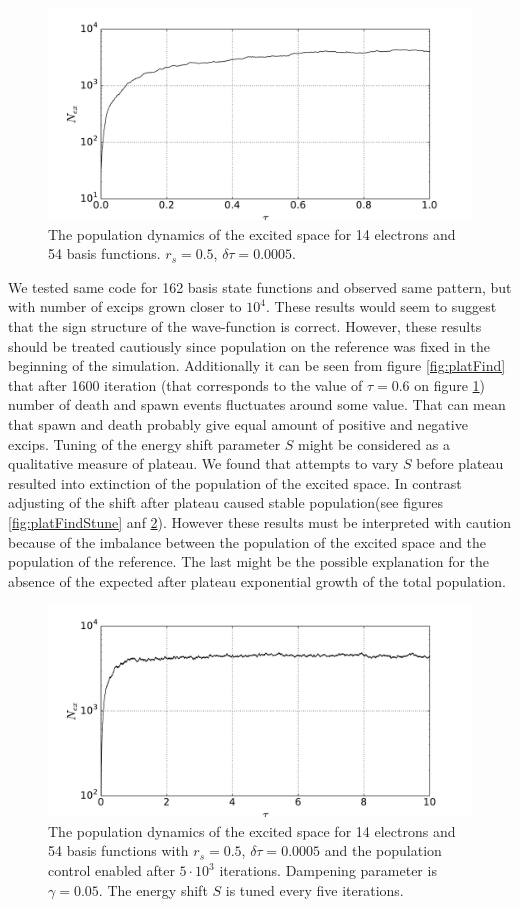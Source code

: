 \documentclass[twoside,english]{uiofysmaster}
\begin{document}
\begin{figure}[ht!]
	\centering
	\includegraphics[width=0.8\linewidth]{Nex2000new}
	\caption{The population dynamics of the excited space for 14 electrons and 54 basis functions. $r_s=0.5$, $\delta \tau=0.0005$.}
	\label{fig:nx2k}
\end{figure}

We tested same code for 162 basis state functions and observed same pattern, but with number of excips grown closer to $10^4$. These results would seem to suggest that the sign structure of the wave-function is correct.
However, these results should be treated cautiously since population on the reference was fixed in the beginning of the simulation. Additionally it can be seen from figure \ref{fig:platFind} that after 1600 iteration (that corresponds to the value of $\tau=0.6$ on figure \ref{fig:nx2k}) number of death and spawn events fluctuates around some value. That can mean that spawn and death probably give equal amount of positive and negative excips.
Tuning of the energy shift parameter $S$ might be considered as a qualitative measure of plateau.
We found that attempts to vary $S$ before plateau resulted into extinction of the population of the excited space. In contrast adjusting of the shift after plateau caused stable population(see figures \ref{fig:platFindStune} anf \ref{fig:nx20k}).
However these results must be interpreted with caution because of the imbalance between the population of the excited space and the population of the reference. The last might be the possible explanation for the absence of the expected after plateau exponential growth of the total population.	



\begin{figure}[ht!]
	\centering
	\includegraphics[width=0.8\linewidth]{Nex20000}
	\caption{The population dynamics of the excited space for 14 electrons and 54 basis functions with $r_s=0.5$, $\delta \tau=0.0005$ and the population control enabled after $5\cdot 10^3$ iterations. Dampening parameter is $\gamma = 0.05$. The energy shift $S$ is tuned every five iterations.}
	\label{fig:nx20k}
\end{figure}
\end{document}
